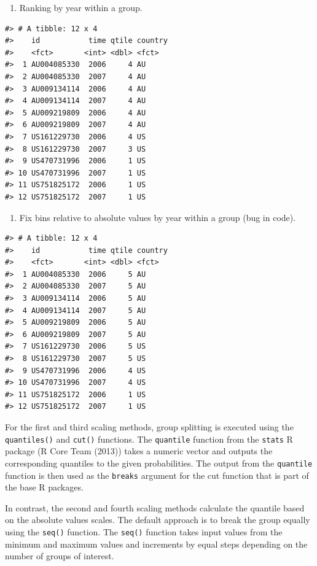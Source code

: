 \begin{enumerate}
\def\labelenumi{\arabic{enumi}.}
\setcounter{enumi}{2}
\tightlist
\item
  Ranking by year within a group.
\end{enumerate}

\begin{verbatim}
#> # A tibble: 12 x 4
#>    id           time qtile country
#>    <fct>       <int> <dbl> <fct>  
#>  1 AU004085330  2006     4 AU     
#>  2 AU004085330  2007     4 AU     
#>  3 AU009134114  2006     4 AU     
#>  4 AU009134114  2007     4 AU     
#>  5 AU009219809  2006     4 AU     
#>  6 AU009219809  2007     4 AU     
#>  7 US161229730  2006     4 US     
#>  8 US161229730  2007     3 US     
#>  9 US470731996  2006     1 US     
#> 10 US470731996  2007     1 US     
#> 11 US751825172  2006     1 US     
#> 12 US751825172  2007     1 US
\end{verbatim}

\begin{enumerate}
\def\labelenumi{\arabic{enumi}.}
\setcounter{enumi}{3}
\tightlist
\item
  Fix bins relative to absolute values by year within a group (bug in code).
\end{enumerate}

\begin{verbatim}
#> # A tibble: 12 x 4
#>    id           time qtile country
#>    <fct>       <int> <dbl> <fct>  
#>  1 AU004085330  2006     5 AU     
#>  2 AU004085330  2007     5 AU     
#>  3 AU009134114  2006     5 AU     
#>  4 AU009134114  2007     5 AU     
#>  5 AU009219809  2006     5 AU     
#>  6 AU009219809  2007     5 AU     
#>  7 US161229730  2006     5 US     
#>  8 US161229730  2007     5 US     
#>  9 US470731996  2006     4 US     
#> 10 US470731996  2007     4 US     
#> 11 US751825172  2006     1 US     
#> 12 US751825172  2007     1 US
\end{verbatim}

For the first and third scaling methods, group splitting is executed using the \texttt{quantiles()} and \texttt{cut()} functions. The \texttt{quantile} function from the \texttt{stats} R package (R Core Team (2013)) takes a numeric vector and outputs the corresponding quantiles to the given probabilities. The output from the \texttt{quantile} function is then used as the \texttt{breaks} argument for the cut function that is part of the base R packages.

In contrast, the second and fourth scaling methods calculate the quantile based on the absolute values scales. The default approach is to break the group equally using the \texttt{seq()} function. The \texttt{seq()} function takes input values from the minimum and maximum values and increments by equal steps depending on the number of groups of interest.

